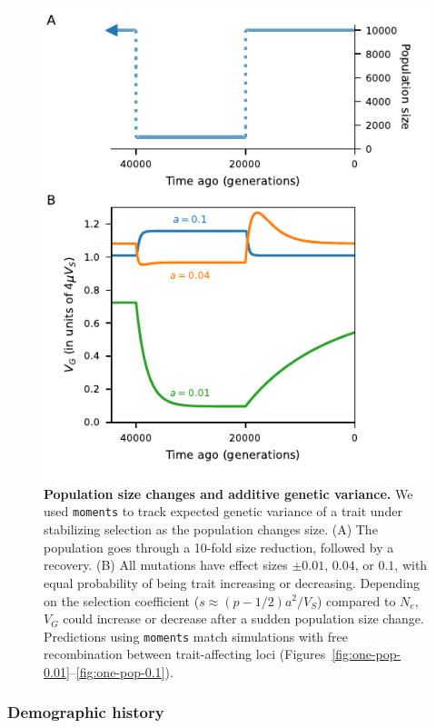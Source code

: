 \documentclass{article}
\newcommand{\moments}{\texttt{moments}\xspace}
\begin{document}
\begin{figure}[tb!]
    \centering
    \includegraphics{../figures/one_pop.pdf}
    \caption{
        \textbf{Population size changes and additive genetic variance.}
        We used \moments to track expected genetic variance of a trait
        under stabilizing selection as the population changes size. (A) The
        population goes through a 10-fold size reduction, followed by a recovery.
        (B) All mutations have effect sizes $\pm0.01$, $0.04$, or $0.1$, with equal
        probability of being trait increasing or decreasing. Depending on the
        selection coefficient ($s\approx (p-1/2)a^2/V_S$) compared to $N_e$, $V_G$
        could increase or decrease after a sudden population size change.
        Predictions using \moments match simulations with free recombination
        between trait-affecting loci
        (Figures~\ref{fig:one-pop-0.01}--\ref{fig:one-pop-0.1}).
    }
    \label{fig:one-pop}
\end{figure}

\subsubsection*{Demographic history}
\end{document}
